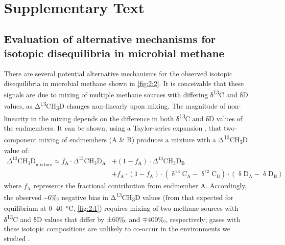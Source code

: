 


\section{Supplementary Text}\label{supplementary-text}

\subsection{Evaluation of alternative mechanisms for isotopic
	disequilibria in microbial methane
}\label{evaluation-of-alternative-mechanisms-for-isotopic-disequilibria-in-microbial-methane}

There are several potential alternative mechanisms for the observed
isotopic disequilibria in microbial methane shown in \autoref{fig:2:2}. It is
conceivable that these signals are due to mixing of multiple methane
sources with differing δ\textsuperscript{13}C and δD values, as
Δ\textsuperscript{13}CH\textsubscript{3}D changes non-linearly upon
mixing. The magnitude of non-linearity in the mixing depends on the
difference in both δ\textsuperscript{13}C and δD values of the
endmembers. It can be shown, using a Taylor-series expansion
\parencite{Ono++_2006_GCA}, that two-component mixing of endmembers (A \& B) produces a
mixture with a Δ\textsuperscript{13}CH\textsubscript{3}D value of:
\begin{equation}\label{eqn:2:mixing}
\begin{split}
{{\Delta}^{{13}}\mathrm{\text{CH}}_{{3}}\mathrm{D}}_{\mathrm{\text{mixture}}} \approx {f}_{\mathrm{A}} \cdot {\Delta}^{{13}}\mathrm{\text{CH}}_{{3}}\mathrm{D}_{\mathrm{A}} &+ \left( {1 -}{f}_{\mathrm{A}} \right)\cdot{\Delta}^{{13}}\mathrm{\text{CH}}_{{3}}\mathrm{D}_{\mathrm{B}} \\
&+ {f}_{\mathrm{A}}\cdot\left( {1 -}{f}_{\mathrm{A}} \right)\cdot\left( {\updelta}^{{13}}\mathrm{C}_{\mathrm{A}}{-}{\updelta}^{{13}}\mathrm{C}_{\mathrm{B}} \right)\cdot\left( {\updelta}\mathrm{D}_{\mathrm{A}}{-}{\updelta}\mathrm{D}_{\mathrm{B}} \right)
\end{split}
\end{equation}
where $f_\text{A}$ represents the fractional contribution
from endmember A. Accordingly, the observed \textasciitilde{}6‰ negative
bias in Δ\textsuperscript{13}CH\textsubscript{3}D values (from that
expected for equilibrium at 0--40~°C, \autoref{fig:2:1}) requires mixing of two
methane sources with δ\textsuperscript{13}C and δD values that differ by
±60‰ and $\mp$400‰, respectively; gases with these isotopic compositions are
unlikely to co-occur in the environments we studied \parencite{Whiticar_1990_OG}.

